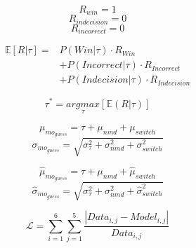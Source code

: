 \documentclass[12pt,letterpaper]{article}
\begin{document}
\begin{equation}
    R_{win} = 1
\end{equation}
\begin{equation}
    R_{indecision} = 0
\end{equation}
\begin{equation}
    R_{incorrect} = 0
\end{equation}

\begin{align}
    \mathbb{E}[R|\tau] = &P(Win|\tau) \cdot R_{Win} \nonumber\\ &+ P(Incorrect|\tau) \cdot R_{Incorrect} \nonumber \\ &+ P(Indecision|\tau) \cdot R_{Indecision}
\end{align}

\begin{equation}
    \tau^* = \underset{\tau}{argmax}[\mathbb{E}(R|\tau)]
\end{equation}

\begin{equation}
    \mu_{mo_{guess}} = \tau +  \mu_{nmd} + \mu_{switch}
\end{equation}
\begin{equation}
    \sigma_{mo_{guess}} = \sqrt{\sigma_{\tau}^2 + \sigma_{nmd}^2 + \sigma_{switch}^2}
\end{equation}

\begin{equation}
    \hat{\mu}_{mo_{guess}} = \tau +  \mu_{nmd} + \hat{\mu}_{switch}
\end{equation}
\begin{equation}
    \hat{\sigma}_{mo_{guess}} = \sqrt{\sigma_{\tau}^2 + \sigma_{nmd}^2 + \hat{\sigma}_{switch}^2}
\end{equation}


\begin{equation}
    \mathcal{L} = \sum_{i = 1}^{6} \sum_{j = 1}^{5} \frac{|Data_{i,j} - Model_{i,j}|}{Data_{i,j}}
\end{equation}
\end{document}
